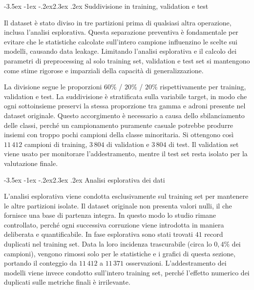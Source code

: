 \documentclass[12pt,a4paper]{article}
\makeatletter
\renewcommand\section{\@startsection{section}{1}{\z@}%
  {-3.5ex \@plus -1ex \@minus -.2ex}{2.3ex \@plus.2ex}%
  {\normalfont\Large\bfseries}}
\makeatother
\begin{document}
\section{Suddivisione in training, validation e test}\label{sec:split}

Il dataset è stato diviso in tre partizioni prima di qualsiasi altra operazione, inclusa l'analisi esplorativa. Questa separazione preventiva è fondamentale per evitare che le statistiche calcolate sull'intero campione influenzino le scelte sui modelli, causando data leakage. Limitando l'analisi esplorativa e il calcolo dei parametri di preprocessing al solo training set, validation e test set si mantengono come stime rigorose e imparziali della capacità di generalizzazione.

La divisione segue le proporzioni $60\%$ / $20\%$ / $20\%$ rispettivamente per training, validation e test. La suddivisione è stratificata sulla variabile target, in modo che ogni sottoinsieme preservi la stessa proporzione tra gamma e adroni presente nel dataset originale. Questo accorgimento è necessario a causa dello sbilanciamento delle classi, perché un campionamento puramente casuale potrebbe produrre insiemi con troppo pochi campioni della classe minoritaria. Si ottengono così $11\,412$ campioni di training, $3\,804$ di validation e $3\,804$ di test. Il validation set viene usato per monitorare l'addestramento, mentre il test set resta isolato per la valutazione finale.

\section{Analisi esplorativa dei dati}\label{sec:eda}

L'analisi esplorativa viene condotta esclusivamente sul training set per mantenere le altre partizioni isolate. Il dataset originale non presenta valori nulli, il che fornisce una base di partenza integra. In questo modo lo studio rimane controllato, perché ogni successiva corruzione viene introdotta in maniera deliberata e quantificabile. In fase esplorativa sono stati trovati $41$ record duplicati nel training set. Data la loro incidenza trascurabile (circa lo $0{,}4\%$ dei campioni), vengono rimossi solo per le statistiche e i grafici di questa sezione, portando il conteggio da $11\,412$ a $11\,371$ osservazioni. L'addestramento dei modelli viene invece condotto sull'intero training set, perché l'effetto numerico dei duplicati sulle metriche finali è irrilevante.
\end{document}
